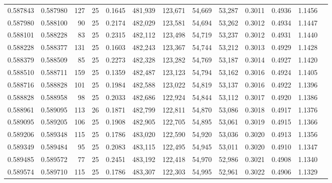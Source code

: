 \begin{tabular}{rrrrrrrrrrrrr}
0.587843 & 0.587980 &   127 &  25 &                                     0.1645 & 481,939 & 123,671 &  54,669 &  53,287 & 0.3011 & 0.4936 & 1.1456 \\
0.587980 & 0.588100 &    90 &  25 &                                     0.2174 & 482,029 & 123,581 &  54,694 &  53,262 & 0.3012 & 0.4934 & 1.1447 \\
0.588101 & 0.588228 &    83 &  25 &                                     0.2315 & 482,112 & 123,498 &  54,719 &  53,237 & 0.3012 & 0.4931 & 1.1440 \\
0.588228 & 0.588377 &   131 &  25 &                                     0.1603 & 482,243 & 123,367 &  54,744 &  53,212 & 0.3013 & 0.4929 & 1.1428 \\
0.588379 & 0.588509 &    85 &  25 &                                     0.2273 & 482,328 & 123,282 &  54,769 &  53,187 & 0.3014 & 0.4927 & 1.1420 \\
0.588510 & 0.588711 &   159 &  25 &                                     0.1359 & 482,487 & 123,123 &  54,794 &  53,162 & 0.3016 & 0.4924 & 1.1405 \\
0.588716 & 0.588828 &   101 &  25 &                                     0.1984 & 482,588 & 123,022 &  54,819 &  53,137 & 0.3016 & 0.4922 & 1.1396 \\
0.588828 & 0.588958 &    98 &  25 &                                     0.2033 & 482,686 & 122,924 &  54,844 &  53,112 & 0.3017 & 0.4920 & 1.1386 \\
0.588961 & 0.589095 &   113 &  26 &                                     0.1871 & 482,799 & 122,811 &  54,870 &  53,086 & 0.3018 & 0.4917 & 1.1376 \\
0.589095 & 0.589205 &   106 &  25 &                                     0.1908 & 482,905 & 122,705 &  54,895 &  53,061 & 0.3019 & 0.4915 & 1.1366 \\
0.589206 & 0.589348 &   115 &  25 &                                     0.1786 & 483,020 & 122,590 &  54,920 &  53,036 & 0.3020 & 0.4913 & 1.1356 \\
0.589349 & 0.589484 &    95 &  25 &                                     0.2083 & 483,115 & 122,495 &  54,945 &  53,011 & 0.3020 & 0.4910 & 1.1347 \\
0.589485 & 0.589572 &    77 &  25 &                                     0.2451 & 483,192 & 122,418 &  54,970 &  52,986 & 0.3021 & 0.4908 & 1.1340 \\
0.589574 & 0.589710 &   115 &  25 &                                     0.1786 & 483,307 & 122,303 &  54,995 &  52,961 & 0.3022 & 0.4906 & 1.1329 \\

\end{tabular}
